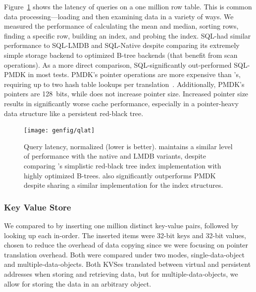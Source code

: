 Figure~\ref{fig:qlat} shows the latency of queries on a one million row table.
This is common data processing---loading and then
examining data in a variety of ways.
We measured the performance
of calculating the mean and median, sorting rows, finding a specific row,
building an index, and probing the index. SQL-\Twizzler had similar performance to SQL-LMDB and
SQL-Native despite comparing its extremely simple storage backend to optimized B-tree
backends (that benefit from scan operations). As a more direct comparison,
SQL-\Twizzler significantly out-performed SQL-PMDK in most tests. PMDK's pointer operations are
more expensive than \Twizzler's, requiring up to two hash table lookups per
translation~\cite{pmdk-pointers}. Additionally, PMDK's
pointers are 128~bits, while \Twizzler does not increase pointer size. Increased
pointer size results in significantly worse cache performance, especially in a pointer-heavy data
structure like a persistent red-black tree.



\begin{figure}
    \centering
    \texttt{[image: genfig/qlat]}
    \caption[Query latency]{Query latency, normalized (lower is better). \Twizzler maintains a similar level of
        performance with the native and LMDB variants, despite comparing \Twizzler's simplistic
        red-black tree index
        implementation with highly optimized B-trees. \Twizzler also significantly outperforms PMDK
        despite sharing a similar implementation for the index structures.}
    \label{fig:qlat}
\end{figure}


\subsubsection{Key Value Store}
\label{sec:kvperf}

We compared \nvkv to \unixkv
by inserting one
million distinct key-value pairs, followed by looking up each in-order. The inserted items were 32-bit
keys and 32-bit values, chosen to reduce the overhead of data copying since we were focusing on
pointer translation overhead.
Both were
compared under two modes, single-data-object and multiple-data-objects. Both KVSes translated
between virtual and persistent addresses when storing and retrieving data, but for
multiple-data-objects, we allow for storing the data in an arbitrary object.

